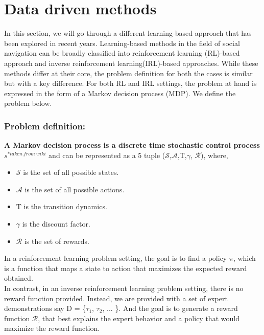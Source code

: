 \section{Data driven methods}
In this section, we will go through a different learning-based approach that has been explored in recent years. Learning-based methods in the field of social navigation can be broadly classified into reinforcement learning (RL)-based approach and inverse reinforcement learning(IRL)-based approaches. While these methods differ at their core, the problem definition for both the cases is similar but with a key difference. For both RL and IRL settings, the problem at hand is expressed in the form of a Markov decision process (MDP). We define the problem below.
\subsubsection*{Problem definition:}
\textbf{A Markov decision process is a discrete time stochastic control process $s^{*taken\ from\ wiki}$} and can be represented as a 5 tuple
($\mathcal{S}$,$\mathcal{A}$,T,$\gamma$, $\mathcal{R}$), where,
\begin{itemize}
	\item $\mathcal{S}$ is the set of all possible states.
	\item $\mathcal{A}$ is the set of all possible actions.
	\item T is the transition dynamics.
	\item $\gamma$ is the discount factor.
	\item $\mathcal{R}$ is the set of rewards.
\end{itemize}  
In a reinforcement learning problem setting, the goal is to find a policy $\pi$, which is a function that maps a state to action that maximizes the expected reward obtained.\\
In contrast, in an inverse reinforcement learning problem setting, there is no reward function provided. Instead, we are provided with a set of expert demonstrations say D = \{$\tau_1$, $\tau_2$, ... \}. And the goal is to generate a reward function $\mathcal{R}$, that best explains the expert behavior and a policy that would maximize the reward function.


